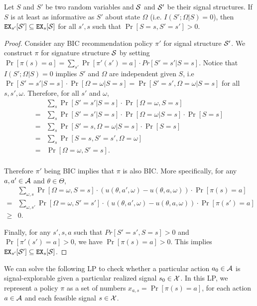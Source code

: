 \begin{lemma}
\label{lem:infomono}
Let $S$ and $S'$ be two random variables and $\S$ and $\S'$ be their signal structures. If $S$ is at least as informative as $S'$ about state $\Omega$ (i.e. $I(S' ; \Omega|S) = 0$), then $\EX_{s'}[\S'] \subseteq \EX_s[\S]$ for all $s' ,s$ such that $\Pr[S= s, S'= s'] > 0$.
\end{lemma}

\begin{proof}
Consider any BIC recommendation policy $\pi'$ for signal structure $\S'$. We construct $\pi$ for signature structure $\S$ by setting $\Pr[\pi(s) = a] = \sum_{s'} \Pr[\pi'(s') = a] \cdot Pr[S' = s'|S = s]$. Notice that $I(S' ; \Omega|S) = 0$ implies $S'$ and $\Omega$ are independent given $S$, i.e $\Pr[S' = s'|S=s] \cdot \Pr[\Omega = \omega|S=s] = \Pr[S'=s', \Omega = \omega|S=s]$ for all $s,s',\omega$. Therefore, for all $s'$ and $\omega$,
\begin{align*}
 &\sum_s \Pr[S' = s'|S = s] \cdot \Pr[\Omega = \omega, S= s] \\
=& \sum_s   \Pr[S' = s'|S=s] \cdot \Pr[\Omega = \omega|S=s] \cdot \Pr[S=s] \\
= &\sum_s \Pr[S'=s,\Omega =\omega|S=s] \cdot \Pr[S=s] \\
= &\sum_s \Pr[S=s,S'=s',\Omega =\omega] \\
= &\Pr[\Omega =\omega, S'=s].\\
\end{align*}

 Therefore $\pi'$ being BIC implies that $\pi$ is also BIC. More specifically, for any $a,a' \in \A$ and $\theta \in \varTheta$,
\begin{align*}
&\sum_{\omega,s} \Pr[\Omega = \omega, S = s] \cdot (u(\theta,a', \omega) - u(\theta,a,\omega)) \cdot \Pr[\pi(s) = a] \\
=&\sum_{\omega,s'}\Pr[\Omega = \omega, S' = s'] \cdot (u(\theta,a', \omega) - u(\theta,a,\omega)) \cdot \Pr[\pi(s') = a] \\
\geq & 0.
\end{align*}


Finally, for any $s', s ,a$ such that $Pr[S' = s',S = s] >0 $ and $\Pr[\pi'(s') = a] >0$, we have $\Pr[\pi(s) = a] > 0$. This implies $\EX_{s'}[\S'] \subseteq \EX_s[\S]$.
\end{proof}

We can solve the following LP to check whether a particular action $a_0 \in\A$ is signal-explorable given a particular realized signal $s_0\in\X$. In this LP, we represent a policy $\pi$ as a set of numbers
    $x_{a,s} = \Pr[\pi(s)=a]$,
for each action $a\in \A$ and each feasible signal $s\in \X$.


